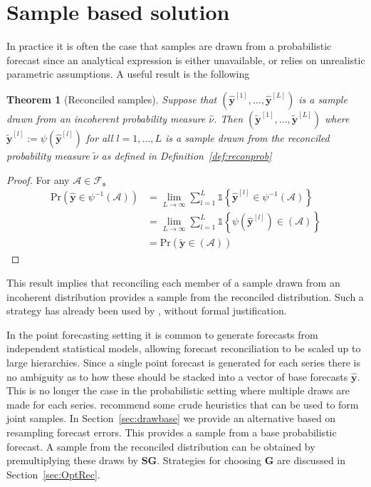 \documentclass[12pt]{article}
\newtheorem{theo}{Theorem}[section]
\theoremstyle{definition}
\begin{document}
\section{Sample based solution}\label{sec:SampleSolution}

In practice it is often the case that samples are drawn from a probabilistic forecast since an analytical expression is either unavailable, or relies on unrealistic parametric assumptions.  A useful result is the following
\begin{theo}[Reconciled samples]
	Suppose that $\left(\hat{\bm y}^{[1]},\ldots,\hat{\bm y}^{[L]}\right)$ is a sample drawn from an incoherent probability measure $\hat{\nu}$.  Then $\left(\tilde{\bm y}^{[1]},\ldots,\tilde{\bm y}^{[L]}\right)$ where $\tilde{\bm y}^{[l]}:=\psi(\hat{\bm y}^{[l]})$ for all $l=1,\ldots,L$ is a sample drawn from the reconciled probability measure $\tilde{\nu}$ as defined in Definition~\ref{def:reconprob}
\end{theo}
\begin{proof}
	For any $\mathcal{A}\in\mathscr{F}_{\mathfrak{s}}$
\begin{align}
	\mbox{Pr}(\hat{{\bm y}}\in\psi^{-1}(\mathcal{A}))&=\underset{L\rightarrow\infty}{\lim}\sum\limits_{l=1}^L\mathbb{1}\left\{\hat{\bm y}^{[l]}\in\psi^{-1}(\mathcal{A})\right\}\nonumber\\
	&=\underset{L\rightarrow\infty}{\lim}\sum\limits_{l=1}^L\mathbb{1}\left\{\psi(\hat{\bm y}^{[l]})\in(\mathcal{A})\right\}\nonumber\\
	&=\mbox{Pr}(\tilde{{\bm y}}\in(\mathcal{A}))\nonumber
\end{align}
\end{proof}

This result implies that reconciling each member of a sample drawn from an incoherent distribution provides a sample from the reconciled distribution.  Such a strategy has already been used by \cite{JeoEtAl2019}, without formal justification.

In the point forecasting setting it is common to generate forecasts from independent statistical models, allowing forecast reconciliation to be scaled up to large hierarchies.  Since a single point forecast is generated for each series there is no ambiguity as to how these should be stacked into a vector of base forecasts $\hat{\bm{y}}$.  This is no longer the case in the probabilistic setting where multiple draws are made for each series.  \cite{JeoEtAl2019} recommend some crude heuristics that can be used to form joint samples.  In Section~\ref{sec:drawbase} we provide an alternative based on resampling forecast errors. This provides a sample from a base probabilistic forecast. A sample from the reconciled distribution can be obtained by premultiplying these draws by $\bm{S}\bm{G}$. Strategies for choosing $\bm{G}$ are discussed in Section~\ref{sec:OptRec}.
\end{document}
